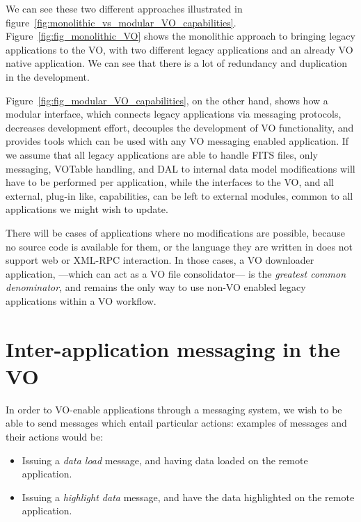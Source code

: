		We can see these two different approaches illustrated in 
		figure~\ref{fig:monolithic_vs_modular_VO_capabilities}. 
		Figure~\ref{fig:fig_monolithic_VO} shows the monolithic
		approach to bringing legacy applications to the VO,
		with two different legacy applications and an already
		VO native application. We can see that there is a lot
		of redundancy and duplication in the development.
		
		Figure~\ref{fig:fig_modular_VO_capabilities}, on the other 
		hand, shows how a modular interface, which connects legacy
		applications via messaging protocols, decreases development
		effort, decouples the development of VO functionality, and
		provides tools which can be used with any VO messaging
		enabled application. If we assume that all legacy
		applications are able to handle FITS files, only messaging,
		VOTable handling, and DAL to internal data model
		modifications will have to be performed per application,
		while the interfaces to the VO, and all external, plug-in
		like, capabilities, can be left to external modules,
		common to all applications we might wish to update.
		
		There will be cases of applications where no modifications
		are possible, because no source code is available for them,
		or the language they are written in does not support
		web or XML-RPC interaction. In those cases, a VO downloader 
		application, ---which can act as a VO file consolidator---
		is the \emph{greatest common denominator}, and remains the
		only way to use non-VO enabled legacy applications within
		a VO workflow.
		
	
	\section{Inter-application messaging in the VO} %
	\label{sec:messaging_and_the_vo}
		
		In order to VO-enable applications through a messaging
		system,
		we wish to be able to send messages which entail particular
		actions: examples of messages and their actions would be:
		
		\begin{itemize}
			\item Issuing a \emph{data load} message, and having
			data loaded on the remote application.
			
			\item Issuing a \emph{highlight data} message, and
			have the data highlighted on the remote application.
		\end{itemize}
		
